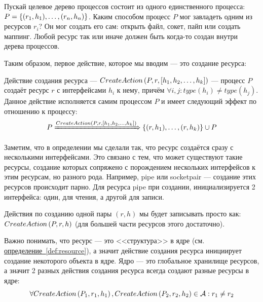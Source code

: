 Пускай целевое дерево процессов состоит из одного единственного процесса: $P = \left\lbrace (r_1, h_1), \ldots, (r_n, h_n) \right\rbrace$. Каким способом процесс $P$ мог завладеть одним из ресурсов $r_i$? Он мог создать его сам: открыть файл, сокет, пайп или создать маппинг. Любой ресурс так или иначе должен быть когда-то создан внутри дерева процессов.

Таким образом, первое действие, которое мы вводим --- это создание ресурса:

\begin{defn}
\label{def:createact}
Действие создания ресурса --- $CreateAction\left( P, r, \left[ h_1, h_2, \ldots, h_k \right] \right)$ --- процесс $P$ создаёт ресурс $r$ с интерфейсами $h_i$ к нему, причём $\forall{i, j}: type(h_i) \neq type(h_j)$. Данное действие исполняется самим процессом $P$ и имеет следующий эффект по отношению к процессу:
\begin{equation*}
	P \xRightarrow{CreateAction\left( P, r, \left[ h_1, h_2, \ldots, h_k \right] \right)} \left\lbrace (r, h_1), \ldots, (r, h_k) \right\rbrace \cup P
\end{equation*}
\end{defn}

\begin{note}
Заметим, что в определении мы сделали так, что ресурс создаётся сразу с несколькими интерфейсами. Это связано с тем, что может существуют такие ресурсы, создание которых сопряжено с порождением нескольких интерфейсов к этим ресурсам, но разного рода. Например, pipe или socketpair --- создание этих ресурсов происходит парно. Для ресурса pipe при создании, инициализируется 2 интерфейса: один, для чтения, а другой для записи.

Действия по созданию одной пары $(r, h)$ мы будет записывать просто как: $CreateAction\left( P, r, h \right)$ (для большей части ресурсов этого достаточно).
\end{note}

\begin{note}
Важно понимать, что ресурс --- это <<структура>> в ядре (см. \hyperref[def:resource]{определение~\ref*{def:resource}}), а значит действие создания ресурса инициирует создание некоторого объекта в ядре. Ядро --- это глобальное хранилище ресурсов, а значит 2 разных действия создания ресурса всегда создают разные ресурсы в ядре:
\begin{equation*}
	\forall CreateAction\left( P_1, r_1, h_1 \right), CreateAction\left( P_2, r_2, h_2 \right) \in \mathcal{A}: r_1 \neq r_2
\end{equation*}
\end{note}

